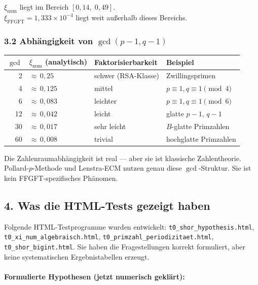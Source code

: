 \begin{mdframed}[style=warn]
$\xi_\text{num}$ liegt im Bereich $[0{,}14,\; 0{,}49]$. \\
$\xi_\text{FFGFT} = 1{,}333 \times 10^{-4}$ liegt weit außerhalb dieses Bereichs.
\end{mdframed}

\subsubsection*{3.2 Abhängigkeit von $\gcd(p-1, q-1)$}

\begin{center}
\begin{tabular}{rlll}
\toprule
$\gcd$ & $\xi_\text{num}$ (analytisch) & Faktorisierbarkeit & Beispiel \\
\midrule
2  & ${\approx}\,0{,}25$ & schwer (RSA-Klasse)  & Zwillingsprimen \\
4  & ${\approx}\,0{,}125$ & mittel              & $p \equiv 1, q \equiv 1 \pmod{4}$ \\
6  & ${\approx}\,0{,}083$ & leichter             & $p \equiv 1, q \equiv 1 \pmod{6}$ \\
12 & ${\approx}\,0{,}042$ & leicht               & glatte $p{-}1$, $q{-}1$ \\
30 & ${\approx}\,0{,}017$ & sehr leicht          & $B$-glatte Primzahlen \\
60 & ${\approx}\,0{,}008$ & trivial              & hochglatte Primzahlen \\
\bottomrule
\end{tabular}
\end{center}

Die Zahlenraumabhängigkeit ist real — aber sie ist klassische Zahlentheorie.
Pollard-$p$-Methode und Lenstra-ECM nutzen genau diese $\gcd$-Struktur.
Sie ist kein FFGFT-spezifisches Phänomen.

\subsection*{4. Was die HTML-Tests gezeigt haben}

Folgende HTML-Testprogramme wurden entwickelt:
\texttt{t0\_shor\_hypothesis.html}, \texttt{t0\_xi\_num\_algebraisch.html},
\texttt{t0\_primzahl\_periodizitaet.html}, \texttt{t0\_shor\_bigint.html}.
Sie haben die Fragestellungen korrekt formuliert, aber keine systematischen
Ergebnistabellen erzeugt.

\paragraph{Formulierte Hypothesen (jetzt numerisch geklärt):}

